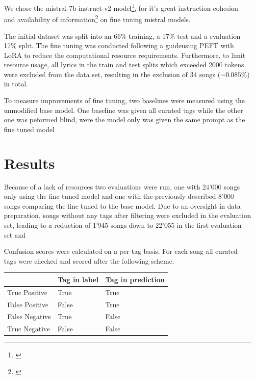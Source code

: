 \documentclass[a4paper,12pt]{scrartcl}
\begin{document}
\begin{multicols}{2}
We chose the mistral-7b-instruct-v2 model\footnote[4]{\cite{jiang_mistral_2023}}, for it's great instruction cohesion and availability of information\footnote[5]{\cite{noauthor_notebooksmistral-finetune-own-dataipynb_nodate}} on fine tuning mistral models.

The initial dataset was split into an 66\% training, a 17\% test and a evaluation 17\% split. The fine tuning was conducted following a guide\footnotemark[5] using PEFT with LoRA to reduce the computational resource requirements. Furthermore, to limit resource usage, all lyrics in the train and test splits which exceeded 2000 tokens were excluded from the data set, resulting in the exclusion of 34 songs ($\sim0.085\%$) in total. 

To measure improvements of fine tuning, two baselines were measured using the unmodified base model. One baseline was given all curated tags while the other one was peformed blind, were the model only was given the same prompt as the fine tuned model  



\section{Results}
Because of a lack of resources two evaluations were run, one with 24'000 songs only using the fine tuned model and one with the previously described 8'000 songs comparing the fine tuned to the base model. Due to an oversight in data preparation, songs without any tags after filtering were excluded in the evaluation set, leading to a reduction of 1'945 songs down to 22’055 in the first evaluation set and 

Confusion scores were calculated on a per tag basis. For each song all curated tags were checked and scored after the following scheme.

\begin{Figure}
\begin{tabular}{l|l|l}
   & Tag in label & Tag in prediction \\
   \hline
True Positive & True         & True              \\
False Positive & False        & True              \\
False Negative & True         & False             \\
True Negative & False        & False            
\end{tabular}
\end{Figure}


\end{multicols}
\end{document}
